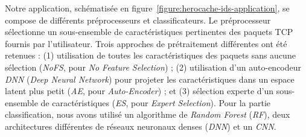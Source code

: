 Notre application, schématisée en figure~\ref{figure:herocache-ids-application}, se compose de différents préprocesseurs et classificateurs. Le préprocesseur sélectionne un sous-ensemble de caractéristiques pertinentes des paquets TCP fournis par l'utilisateur. Trois approches de prétraitement différentes ont été retenues : (1) utilisation de toutes les caractéristiques des paquets sans aucune sélection (\textit{NoFS}, pour \textit{No Feature Selection}) ; (2) utilisation d'un auto-encodeur \textit{DNN} (\textit{Deep Neural Network}) pour projeter les caractéristiques dans un espace latent plus petit (\textit{AE}, pour \textit{Auto-Encoder}) ; et (3) sélection experte d'un sous-ensemble de caractéristiques (\textit{ES}, pour \textit{Expert Selection}). Pour la partie classification, nous avons utilisé un algorithme de \textit{Random Forest} (\textit{RF}), deux architectures différentes de réseaux neuronaux denses (\textit{DNN}) et un \textit{CNN}.

